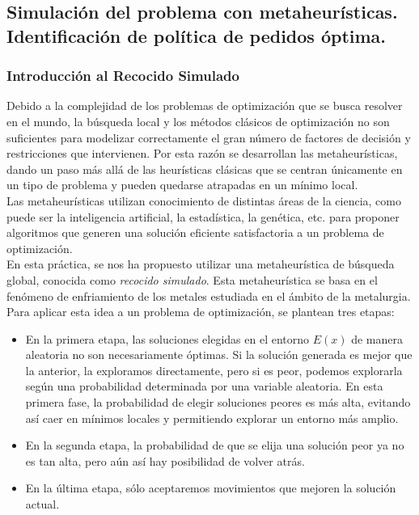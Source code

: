 \documentclass[a4paper,12pt]{article}
\begin{document}
	\subsection{Simulación del problema con metaheurísticas. Identificación de política de pedidos óptima.}
	
	\subsubsection{Introducción al Recocido Simulado}
	
	Debido a la complejidad de los problemas de optimización que se busca resolver en el mundo, la búsqueda local y los métodos clásicos de optimización no son suficientes para modelizar correctamente el gran número de factores de decisión y restricciones que intervienen. Por esta razón se desarrollan las metaheurísticas, dando un paso más allá de las heurísticas clásicas que se centran únicamente en un tipo de problema y pueden quedarse atrapadas en un mínimo local.\\
	
	Las metaheurísticas	utilizan conocimiento de distintas áreas de la ciencia, como puede ser la inteligencia artificial, la estadística, la genética, etc. para proponer algoritmos que generen una solución eficiente  satisfactoria a un problema de optimización.\\
	
	En esta práctica, se nos ha propuesto utilizar una metaheurística de búsqueda global, conocida como \textit{recocido simulado}. Esta metaheurística se basa en el fenómeno de enfriamiento de los metales estudiada en el ámbito de la metalurgia. \\
	
	Para aplicar esta idea a un problema de optimización, se plantean tres etapas:
	\begin{itemize}
		\item En la primera etapa, las soluciones elegidas en el entorno $E(x)$ de manera aleatoria no son necesariamente óptimas. Si la solución generada es mejor que la anterior, la exploramos directamente, pero si es peor, podemos explorarla según una probabilidad determinada por una variable aleatoria. En esta primera fase, la probabilidad de elegir soluciones peores es más alta, evitando así caer en mínimos locales y permitiendo explorar un entorno más amplio.
		\item En la segunda etapa, la probabilidad de que se elija una solución peor ya no es tan alta, pero aún así hay posibilidad de volver atrás.
		\item En la última etapa, sólo aceptaremos movimientos que mejoren la solución actual.
	\end{itemize}
	
\end{document}
